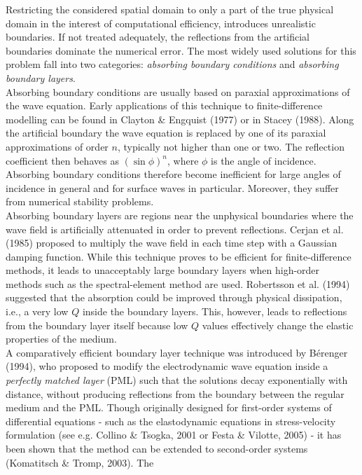 Restricting the considered spatial domain to only a part of the true physical
domain in the interest of computational efficiency, introduces
unrealistic boundaries. If not treated adequately, the reflections
from the artificial boundaries dominate the numerical error. The
most widely used solutions for this problem fall into two
categories: \emph{absorbing boundary conditions} and \emph{absorbing
boundary layers}.\\
Absorbing boundary conditions are usually based on paraxial
approximations of the wave equation. Early applications of this
technique to finite-difference modelling can be found in Clayton \&
Engquist (1977) or in Stacey (1988). Along the artificial boundary the wave
equation is replaced by one of its paraxial approximations of order
$n$, typically not higher than one or two. The reflection
coefficient then behaves as $(\sin \phi)^n$, where $\phi$ is the
angle of incidence. Absorbing boundary conditions therefore become
inefficient for large angles of incidence in general and for surface
waves in particular. Moreover, they suffer from numerical stability
problems.\\
Absorbing boundary layers are regions near the unphysical boundaries
where the wave field is artificially attenuated in order to prevent
reflections. Cerjan et al. (1985) proposed to multiply the wave
field in each time step with a Gaussian damping function. While this
technique proves to be efficient for finite-difference methods, it
leads to unacceptably large boundary layers when high-order methods
such as the spectral-element method are used. Robertsson et al.
(1994) suggested that the absorption could be improved through
physical dissipation, i.e., a very low $Q$ inside the boundary
layers. This, however, leads to reflections from the boundary layer
itself because low $Q$ values effectively change the elastic
properties of the medium.\\
A comparatively efficient boundary layer technique was introduced by
B\'{e}renger (1994), who proposed to modify the electrodynamic wave
equation inside a \emph{perfectly matched layer} (PML) such that the
solutions decay exponentially with distance, without producing
reflections from the boundary between the regular medium and the
PML. Though originally designed for first-order systems of
differential equations - such as the elastodynamic equations in
stress-velocity formulation (see e.g. Collino \& Tsogka, 2001 or
Festa \& Vilotte, 2005) - it has been shown that the method can be
extended to second-order systems (Komatitsch \& Tromp, 2003). The
